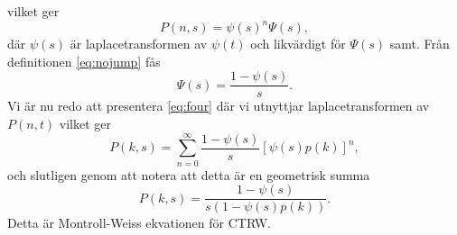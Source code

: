 vilket ger 
\begin{equation}
P(n,s) = \psi(s)^n\Psi(s),
\end{equation}
där $\psi(s)$ är laplacetransformen av $\psi(t)$ och likvärdigt för $\Psi(s)$ samt. Från definitionen \eqref{eq:nojump} fås 
\begin{equation}
\Psi(s) = \frac{1-\psi(s)}{s}.
\end{equation}
Vi är nu redo att presentera \eqref{eq:four} där vi utnyttjar laplacetransformen av $P(n,t)$ vilket ger 
\begin{equation}
P(k,s) = \sum_{n=0}^{\infty} \frac{1-\psi(s)}{s}[\psi(s)p(k)]^n,
\end{equation}
och slutligen genom att notera att detta är en geometrisk summa 
\begin{equation}\label{eq:master}
P(k,s) = \frac{1-\psi(s)}{s(1-\psi(s)p(k))}.
\end{equation}
Detta är Montroll-Weiss ekvationen för CTRW.

